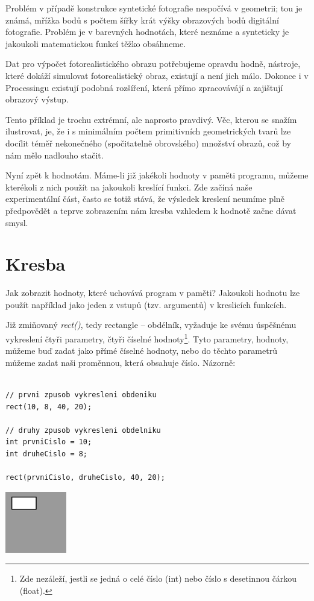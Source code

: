 \documentclass[10pt]{book}
\newcommand{\oddil}[1]{\section{#1}\index{#1}\label{#1}}
\newcommand{\vyraz}[1]{\textit{\gls{#1}}\index{#1}\label{#1}}
\begin{document}
Problém v případě konstrukce syntetické fotografie nespočívá v geometrii; tou je známá, mřížka bodů s počtem šířky krát výšky obrazových bodů digitální fotografie. Problém je v barevných hodnotách, které neznáme a synteticky je jakoukoli matematickou funkcí těžko obsáhneme.

Dat pro výpočet fotorealistického obrazu potřebujeme opravdu hodně, nástroje, které dokáží simulovat fotorealistický obraz, existují a není jich málo. Dokonce i v Processingu existují podobná rozšíření, která přímo zpracovávájí a zajištují obrazový výstup.

Tento příklad je trochu extrémní, ale naprosto pravdivý. Věc, kterou se snažím ilustrovat, je, že i s minimálním počtem primitivních geometrických tvarů lze docílit téměř nekonečného (spočitatelně obrovského) množství obrazů, což by nám mělo nadlouho stačit.

Nyní zpět k hodnotám. Máme-li již jakékoli hodnoty v paměti programu, můžeme kterékoli z nich použít na jakoukoli kreslící funkci. Zde začíná naše experimentální část, často se totiž stává, že výsledek kreslení neumíme plně předpovědět a teprve zobrazením nám kresba vzhledem k hodnotě začne dávat smysl.

\oddil{Kresba}

Jak zobrazit hodnoty, které uchovává program v paměti? Jakoukoli hodnotu lze použít například jako jeden z vstupů (tzv. argumentů) v kreslicích funkcích.

Již zmiňovaný \vyraz{rect()}, tedy rectangle -- obdélník, vyžaduje ke svému úspěšnému vykreslení čtyři parametry, čtyři číselné hodnoty\footnote{Zde nezáleží, jestli se jedná o celé číslo (int) nebo číslo s desetinnou čárkou (float).}. Tyto parametry, hodnoty, můžeme buď zadat jako přímé číselné hodnoty, nebo do těchto parametrů můžeme zadat naši proměnnou, která obsahuje číslo. Názorně:

\begin{lstlisting}

// prvni zpusob vykresleni obdeniku
rect(10, 8, 40, 20);

// druhy zpusob vykresleni obdelniku
int prvniCislo = 10;
int druheCislo = 8;

rect(prvniCislo, druheCislo, 40, 20);

\end{lstlisting}


\begin{center}
\includegraphics[width = 0.2\textwidth]{imgs/kresba-1.png}
\end{center}
\end{document}
